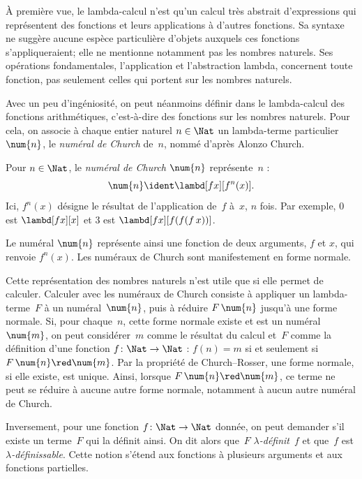 \documentclass[../../../include/open-logic-section]{subfiles}
\begin{document}

À première vue, le lambda-calcul n'est qu'un
calcul très abstrait d'expressions qui
représentent des fonctions et leurs applications
à d'autres fonctions. Sa syntaxe ne suggère
aucune espèce particulière d'objets auxquels
ces fonctions s'appliqueraient; elle ne
mentionne notamment pas les nombres naturels.
Ses opérations fondamentales, l'application
et l'abstraction lambda, concernent toute
fonction, pas seulement celles qui portent
sur les nombres naturels.

Avec un peu d'ingéniosité, on peut néanmoins
définir dans le lambda-calcul des fonctions
arithmétiques, c'est-à-dire des fonctions
sur les nombres naturels. Pour cela, on
associe à chaque entier naturel
$n\in\Nat$ un lambda-terme particulier
$\num{n}$, le \emph{numéral de Church}
de~$n$, nommé d'après Alonzo Church.

\begin{defn}
Pour $n\in\Nat$, le \emph{numéral de Church}
$\num{n}$ représente~$n$ :
\[
  \num{n} \ident \lambd[fx][f^n(x)].
\]
Ici, $f^n(x)$ désigne le résultat de
l'application de~$f$ à~$x$, $n$ fois.
Par exemple, $\num{0}$ est
$\lambd[fx][x]$ et $\num{3}$ est
$\lambd[fx][f(f(f\,x))]$.
\end{defn}

Le numéral $\num{n}$ représente ainsi
une fonction de deux arguments, $f$ et
$x$, qui renvoie $f^n(x)$. Les numéraux
de Church sont manifestement en forme
normale.

Cette représentation des nombres naturels
n'est utile que si elle permet de calculer.
Calculer avec les numéraux de Church
consiste à appliquer un lambda-terme~$F$
à un numéral~$\num{n}$, puis à réduire
$F\,\num{n}$ jusqu'à une forme normale.
Si, pour chaque~$n$, cette forme normale
existe et est un numéral~$\num{m}$,
on peut considérer~$m$ comme le résultat
du calcul et~$F$ comme la définition
d'une fonction $f\colon\Nat\to\Nat$ :
$f(n)=m$ si et seulement si
$F\,\num{n}\red\num{m}$. Par la
propriété de Church--Rosser, une forme
normale, si elle existe, est unique.
Ainsi, lorsque $F\,\num{n}\red\num{m}$,
ce terme ne peut se réduire à aucune
autre forme normale, notamment à aucun
autre numéral de Church.

Inversement, pour une fonction
$f\colon\Nat\to\Nat$ donnée, on peut
demander s'il existe un terme~$F$ qui
la définit ainsi. On dit alors que~$F$
\emph{$\lambda$-définit}~$f$ et que~$f$
est \emph{$\lambda$-définissable}.
Cette notion s'étend aux fonctions à
plusieurs arguments et aux fonctions
partielles.
\end{document}
